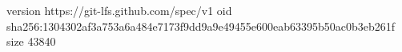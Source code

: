 version https://git-lfs.github.com/spec/v1
oid sha256:1304302af3a753a6a484e7173f9dd9a9e49455e600eab63395b50ac0b3eb261f
size 43840
